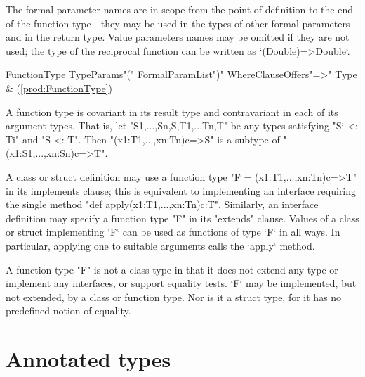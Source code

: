
The formal parameter names are in scope from the point of definition to the
end of the function type---they may be used in the types of other formal parameters
and in the return type. 
Value parameters names may be
omitted if they are not used; the type of the reciprocal function can be
written as
\xcd`(Double)=>Double`. 

\begin{bbgrammar}
 FunctionType    \: TypeParams\opt \xcd"(" FormalParamList\opt \xcd")" WhereClause\opt Offers\opt \xcd"=>" Type & (\ref{prod:FunctionType})\\%
\end{bbgrammar}







A function type is covariant in its result type and contravariant in
each of its argument types. That is, let 
\xcd"S1,...,Sn,S,T1,...Tn,T" be any
types satisfying \xcd"Si <: Ti" and \xcd"S <: T". Then
\xcd"(x1:T1,...,xn:Tn){c}=>S" is a subtype of
\xcd"(x1:S1,...,xn:Sn){c}=>T".



A class or struct definition may use a function type 
\xcd"F = (x1:T1,...,xn:Tn){c}=>T" in its 
implements clause; 
this is equivalent to implementing an interface requiring the single method
\xcd"def apply(x1:T1,...,xn:Tn){c}:T". 
Similarly, an interface
definition may specify a function type \xcd"F" in its \xcd"extends" clause.
Values of a class or struct implementing \xcd`F` 
can be used as functions of type \xcd`F` in all ways.  
In particular, applying one to suitable arguments calls the \xcd`apply`
method. 



A function type \xcd"F" is not a class type in that it does not extend any
type or implement any interfaces, or support equality tests. 
\xcd`F` may be implemented, but not extended, by a class or function type. 
Nor is it a struct type, for it has no predefined notion of equality.




\section{Annotated types}
\label{AnnotatedTypes}


